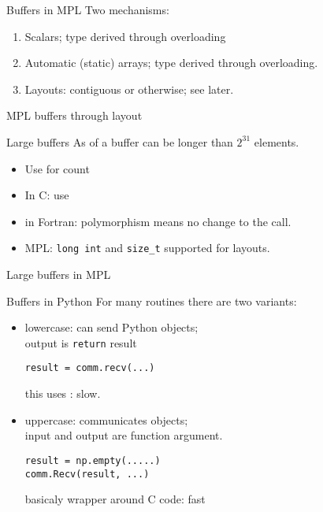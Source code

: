 \begin{mpl}
  \addtocounter{slidecount}{-1}
\begin{numberedframe}{Buffers in MPL}
  Two mechanisms:
  \begin{enumerate}
  \item Scalars; type derived through overloading
  \item Automatic (static) arrays; type derived through overloading.
  \item Layouts: contiguous or otherwise; see later.
  \end{enumerate}  
\end{numberedframe}
\begin{numberedframe}{MPL buffers through layout}
  
\end{numberedframe}
\end{mpl}

\begin{numberedframe}{Large buffers}
  As of  a buffer can be longer than $2^{31}$ elements.\\
  \begin{itemize}
  \item Use  for count
  \item In C: use 
  \item in Fortran: polymorphism means no change to the call.
  \item MPL: \lstinline{long int} and \lstinline{size_t} supported for layouts.
  \end{itemize}
\end{numberedframe}

\begin{mpl}
  \addtocounter{slidecount}{-1}
\begin{numberedframe}{Large buffers in MPL}
    
\end{numberedframe}
\end{mpl}

\begin{python}
  \addtocounter{slidecount}{-1}
\begin{numberedframe}{Buffers in Python}
  For many routines there are two variants:
  \begin{itemize}
  \item lowercase: can send Python objects;\\
    output is \lstinline{return} result\\
\begin{verbatim}
result = comm.recv(...)
\end{verbatim}
    this uses : slow.
  \item uppercase: communicates  objects;\\
    input and output are function argument.
\begin{verbatim}
result = np.empty(.....)
comm.Recv(result, ...)
\end{verbatim}
    basicaly wrapper around C code: fast
  \end{itemize}
\end{numberedframe}
\end{python}


